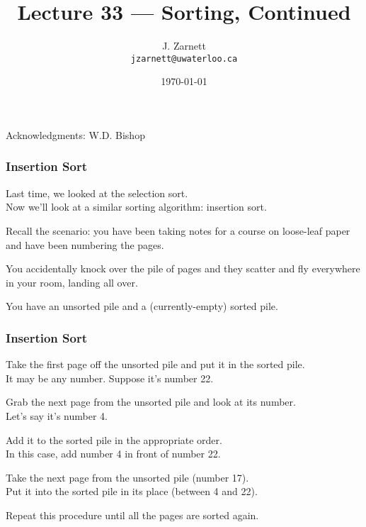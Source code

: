 

\title{Lecture 33 --- Sorting, Continued }

\author{J. Zarnett\\
\texttt{jzarnett@uwaterloo.ca}}
\date{\today}



\begin{frame}
  \titlepage
  
  \begin{center}
  \small{Acknowledgments: W.D. Bishop}
  \end{center}
\end{frame}

\begin{frame}
\frametitle{Insertion Sort}
Last time, we looked at the selection sort.\\
\quad Now we'll look at a similar sorting algorithm: insertion sort.

Recall the scenario: you have been taking notes for a course on loose-leaf paper and have been numbering the pages.

You accidentally knock over the pile of pages and they scatter and fly everywhere in your room, landing all over.

You have an unsorted pile and a (currently-empty) sorted pile.

\end{frame}


\begin{frame}
\frametitle{Insertion Sort}

Take the first page off the unsorted pile and put it in the sorted pile.\\
\quad It may be any number. Suppose it's number 22.

Grab the next page from the unsorted pile and look at its number.\\
\quad Let's say it's number 4.

Add it to the sorted pile in the appropriate order.\\
\quad In this case, add number 4 in front of number 22.

Take the next page from the unsorted pile (number 17).\\
\quad Put it into the sorted pile in its place (between 4 and 22).

Repeat this procedure until all the pages are sorted again.

\end{frame}


